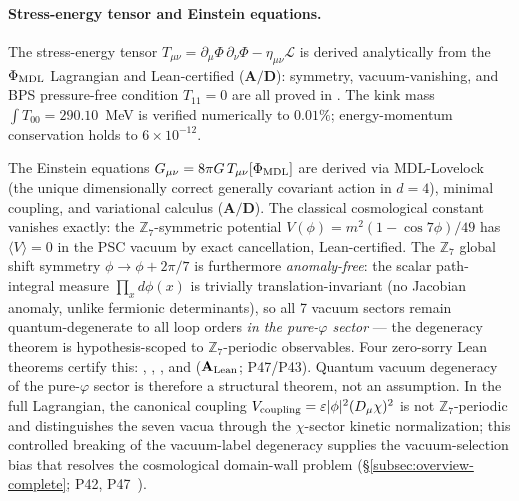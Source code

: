 \paragraph{Stress-energy tensor and Einstein equations.}
The stress-energy tensor
$T_{\mu\nu} = \partial_\mu\Phi\,\partial_\nu\Phi - \eta_{\mu\nu}\mathcal{L}$ is
derived analytically from the $\Phi_{\rm MDL}$ Lagrangian and Lean-certified
($\mathbf{A/D}$): symmetry, vacuum-vanishing, and BPS pressure-free condition
$T_{11} = 0$ are all proved in .  The kink mass
$\int T_{00} = 290.10$~MeV is verified numerically to $0.01\%$; energy-momentum
conservation holds to $6 \times 10^{-12}$.

The Einstein equations $G_{\mu\nu} = 8\pi G\,T_{\mu\nu}[\Phi_{\rm MDL}]$ are derived
via MDL-Lovelock (the unique dimensionally correct generally covariant action in
$d{=}4$), minimal coupling, and variational calculus ($\mathbf{A/D}$).  The
classical cosmological constant vanishes exactly: the $\mathbb{Z}_7$-symmetric
potential $V(\phi) = m^2(1-\cos 7\phi)/49$ has $\langle V \rangle = 0$ in the PSC
vacuum by exact cancellation, Lean-certified.  The $\mathbb{Z}_7$ global shift
symmetry $\phi\to\phi+2\pi/7$ is furthermore \emph{anomaly-free}: the scalar
path-integral measure $\prod_x d\phi(x)$ is trivially translation-invariant (no
Jacobian anomaly, unlike fermionic determinants), so all 7 vacuum sectors
remain quantum-degenerate to all loop orders \emph{in the pure-$\varphi$ sector}
--- the degeneracy theorem is hypothesis-scoped to $\mathbb{Z}_7$-periodic
observables.  Four zero-sorry Lean theorems
certify this: , ,
, and 
($\mathbf{A}_{\rm Lean}$; P47/P43).  Quantum vacuum degeneracy of the pure-$\varphi$
sector is therefore a structural theorem, not an assumption.  In the full Lagrangian,
the canonical coupling $V_{\rm coupling} = \varepsilon|\phi|^2(D_\mu\chi)^2$ is not
$\mathbb{Z}_7$-periodic and distinguishes the seven vacua through the $\chi$-sector
kinetic normalization; this controlled breaking of the vacuum-label degeneracy
supplies the vacuum-selection bias that resolves the cosmological domain-wall
problem (\S\ref{subsec:overview-complete};
P42, P47~\cite{SpivackPhiMDLField,SpivackGTECosmology}).

